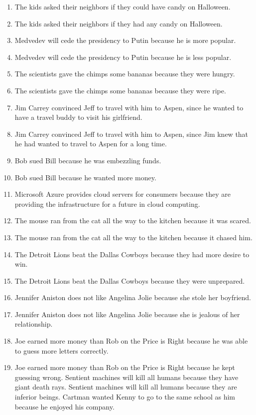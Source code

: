 \documentclass{article}
\begin{document}
\begin{enumerate}
\item The kids asked their neighbors if they could have candy on Halloween.
\item The kids asked their neighbors if they had any candy on Halloween.
\item Medvedev will cede the presidency to Putin because he is more popular.
\item Medvedev will cede the presidency to Putin because he is less popular.
\item The scientists gave the chimps some bananas because they were hungry.
\item The scientists gave the chimps some bananas because they were ripe.
\item Jim Carrey convinced Jeff to travel with him to Aspen, since he wanted to have a travel buddy to visit his girlfriend.
\item Jim Carrey convinced Jeff to travel with him to Aspen, since Jim knew that he had wanted to travel to Aspen for a long time.
\item Bob sued Bill because he was embezzling funds.
\item Bob sued Bill because he wanted more money.
\item Microsoft Azure provides cloud servers for consumers because they are providing the infrastructure for a future in cloud computing.
\item The mouse ran from the cat all the way to the kitchen because it was scared.
\item The mouse ran from the cat all the way to the kitchen because it chased him.
\item The Detroit Lions beat the Dallas Cowboys because they had more desire to win.
\item The Detroit Lions beat the Dallas Cowboys because they were unprepared.
\item Jennifer Aniston does not like Angelina Jolie because she stole her boyfriend.
\item Jennifer Aniston does not like Angelina Jolie because she is jealous of her relationship.
\item Joe earned more money than Rob on the Price is Right because he was able to guess more letters correctly.
\item Joe earned more money than Rob on the Price is Right because he kept guessing wrong.
Sentient machines will kill all humans because they have giant death rays.
Sentient machines will kill all humans because they are inferior beings.
Cartman wanted Kenny to go to the same school as him because he enjoyed his company.

\end{enumerate}
\end{document}
